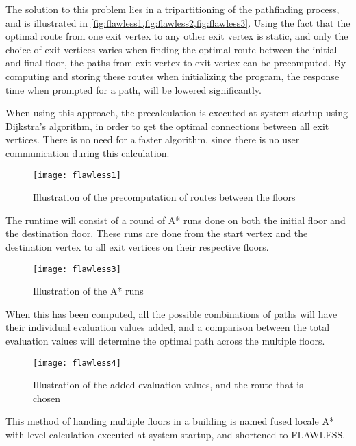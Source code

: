 The solution to this problem lies in a tripartitioning of the pathfinding process, and is illustrated in \cref{fig:flawless1,fig:flawless2,fig:flawless3}. Using the fact that the optimal route from one exit vertex to any other exit vertex is static, and only the choice of exit vertices varies when finding the optimal route between the initial and final floor, the paths from exit vertex to exit vertex can be precomputed. By computing and storing these routes when initializing the program, the response time when prompted for a path, will be lowered significantly.

When using this approach, the precalculation is executed at system startup using Dijkstra's algorithm, in order to get the optimal connections between all exit vertices. There is no need for a faster algorithm, since there is no user communication during this calculation.

\begin{figure}[ht!]
    \centering
    \texttt{[image: flawless1]}
    \caption{Illustration of the precomputation of routes between the floors}
    \label{fig:flawless1}
  \end{figure}

The runtime will consist of a round of A* runs done on both the initial floor and the destination floor. These runs are done from the start vertex and the destination vertex to all exit vertices on their respective floors. 

\begin{figure}[ht!]
    \centering
    \texttt{[image: flawless3]}
    \caption{Illustration of the A* runs}
    \label{fig:flawless2}
  \end{figure}

When this has been computed, all the possible combinations of paths will have their individual evaluation values added, and a comparison between the total evaluation values will determine the optimal path across the multiple floors. 

\begin{figure}[ht!]
    \centering
    \texttt{[image: flawless4]}
    \caption{Illustration of the added evaluation values, and the route that is chosen}
    \label{fig:flawless3}
  \end{figure}

This method of handing multiple floors in a building is named fused locale A* with level-calculation executed at system startup, and shortened to FLAWLESS.


